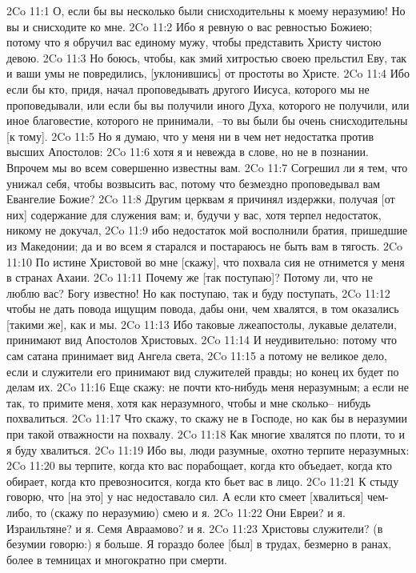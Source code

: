 2Co 11:1  О, если бы вы несколько были снисходительны к моему неразумию! Но вы и снисходите ко мне.
2Co 11:2  Ибо я ревную о вас ревностью Божиею; потому что я обручил вас единому мужу, чтобы представить Христу чистою девою.
2Co 11:3  Но боюсь, чтобы, как змий хитростью своею прельстил Еву, так и ваши умы не повредились, [уклонившись] от простоты во Христе.
2Co 11:4  Ибо если бы кто, придя, начал проповедывать другого Иисуса, которого мы не проповедывали, или если бы вы получили иного Духа, которого не получили, или иное благовестие, которого не принимали, --то вы были бы очень снисходительны [к тому].
2Co 11:5  Но я думаю, что у меня ни в чем нет недостатка против высших Апостолов:
2Co 11:6  хотя я и невежда в слове, но не в познании. Впрочем мы во всем совершенно известны вам.
2Co 11:7  Согрешил ли я тем, что унижал себя, чтобы возвысить вас, потому что безмездно проповедывал вам Евангелие Божие?
2Co 11:8  Другим церквам я причинял издержки, получая [от них] содержание для служения вам; и, будучи у вас, хотя терпел недостаток, никому не докучал,
2Co 11:9  ибо недостаток мой восполнили братия, пришедшие из Македонии; да и во всем я старался и постараюсь не быть вам в тягость.
2Co 11:10  По истине Христовой во мне [скажу], что похвала сия не отнимется у меня в странах Ахаии.
2Co 11:11  Почему же [так поступаю]? Потому ли, что не люблю вас? Богу известно! Но как поступаю, так и буду поступать,
2Co 11:12  чтобы не дать повода ищущим повода, дабы они, чем хвалятся, в том оказались [такими же], как и мы.
2Co 11:13  Ибо таковые лжеапостолы, лукавые делатели, принимают вид Апостолов Христовых.
2Co 11:14  И неудивительно: потому что сам сатана принимает вид Ангела света,
2Co 11:15  а потому не великое дело, если и служители его принимают вид служителей правды; но конец их будет по делам их.
2Co 11:16  Еще скажу: не почти кто-нибудь меня неразумным; а если не так, то примите меня, хотя как неразумного, чтобы и мне сколько-- нибудь похвалиться.
2Co 11:17  Что скажу, то скажу не в Господе, но как бы в неразумии при такой отважности на похвалу.
2Co 11:18  Как многие хвалятся по плоти, то и я буду хвалиться.
2Co 11:19  Ибо вы, люди разумные, охотно терпите неразумных:
2Co 11:20  вы терпите, когда кто вас порабощает, когда кто объедает, когда кто обирает, когда кто превозносится, когда кто бьет вас в лицо.
2Co 11:21  К стыду говорю, что [на это] у нас недоставало сил. А если кто смеет [хвалиться] чем-либо, то (скажу по неразумию) смею и я.
2Co 11:22  Они Евреи? и я. Израильтяне? и я. Семя Авраамово? и я.
2Co 11:23  Христовы служители? (в безумии говорю:) я больше. Я гораздо более [был] в трудах, безмерно в ранах, более в темницах и многократно при смерти.
